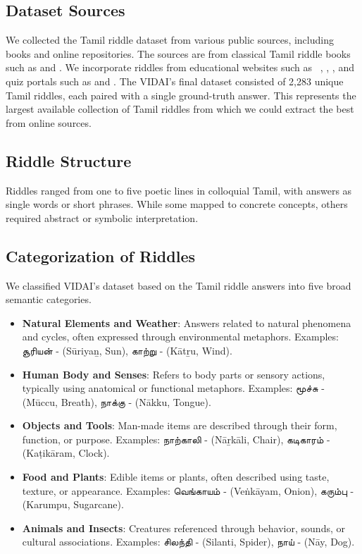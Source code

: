 \documentclass[11pt]{article}
\begin{document}
\subsection{Dataset Sources}
We collected the Tamil riddle dataset from various public sources, including books and online repositories. The sources are from classical Tamil riddle books such as \cite{1000tamilriddlesbook} and \cite{500tamilriddlesbook}. We incorporate riddles from educational websites such as ~\cite{vidukathaitamil}, \cite{tamilvidukathaigal2020}, \cite{tamilvidukathaigal2024}, and quiz portals such as \cite{tamilvidukathaigalquiz} and \cite{tamilmolzigalvidukathaigal}. The VIDAI's final dataset consisted of 2,283 unique Tamil riddles, each paired with a single ground-truth answer. This represents the largest available collection of Tamil riddles from which we could extract the best from online sources.

\subsection{Riddle Structure}
Riddles ranged from one to five poetic lines in colloquial Tamil, with answers as single words or short phrases. While some mapped to concrete concepts, others required abstract or symbolic interpretation.

\subsection{Categorization of Riddles}
We classified VIDAI's dataset based on the Tamil riddle answers into five broad semantic categories.
\begin{itemize}
\item \textbf{Natural Elements and Weather}: Answers related to natural phenomena and cycles, often expressed through environmental metaphors. Examples: {\tam சூரியன்} - (Sūriyaṉ, Sun), {\tam காற்று} - (Kātṟu, Wind).
\item \textbf{Human Body and Senses}: Refers to body parts or sensory actions, typically using anatomical or functional metaphors. Examples: {\tam மூச்சு} - (Mūccu, Breath), {\tam நாக்கு} - (Nākku, Tongue).
\item \textbf{Objects and Tools}: Man-made items are described through their form, function, or purpose. Examples: {\tam நாற்காலி} - (Nāṟkāli, Chair), {\tam கடிகாரம்} - (Kaṭikāram, Clock).
\item \textbf{Food and Plants}: Edible items or plants, often described using taste, texture, or appearance. Examples: {\tam வெங்காயம்} - (Veṅkāyam, Onion), {\tam கரும்பு} - (Karumpu, Sugarcane).
\item \textbf{Animals and Insects}: Creatures referenced through behavior, sounds, or cultural associations. Examples: {\tam சிலந்தி} - (Silanti, Spider), {\tam நாய்} - (Nāy, Dog).
\end{itemize}
\end{document}
